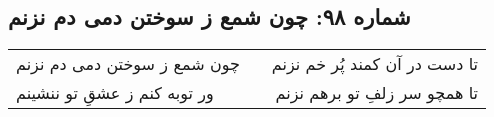 \begin{center}
\section*{شماره ۹۸: چون شمع ز سوختن دمی دم نزنم}
\label{sec:098}
\begin{longtable}{l p{0.5cm} r}
چون شمع ز سوختن دمی دم نزنم
&&
تا دست در آن کمند پُر خم نزنم
\\
ور توبه کنم ز عشقِ تو ننشینم
&&
تا همچو سر‍ زلفِ تو برهم نزنم
\\
\end{longtable}
\end{center}
